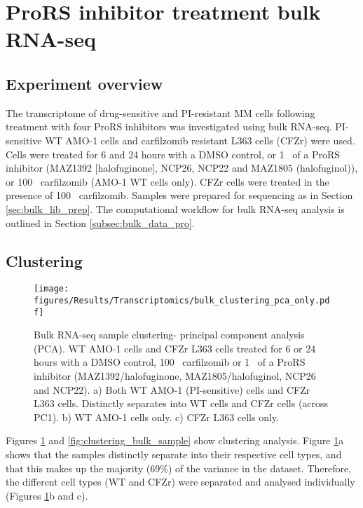 \clearpage

\section{ProRS inhibitor treatment bulk RNA-seq}

\subsection{Experiment overview}
The transcriptome of drug-sensitive and PI-resistant MM cells following treatment with four ProRS inhibitors was investigated using bulk RNA-seq.
PI-sensitive WT AMO-1 cells and carfilzomib resistant L363 cells (CFZr) were used.
Cells were treated for 6 and 24 hours with a DMSO control, or 1\si{\micro\Molar} of a ProRS inhibitor (MAZ1392 [halofuginone], NCP26, NCP22 and MAZ1805 (halofuginol)), or 100\si{\nano\Molar} carfilzomib (AMO-1 WT cells only).
CFZr cells were treated in the presence of 100\si{\nano\Molar} carfilzomib.
Samples were prepared for sequencing as in Section \ref{sec:bulk_lib_prep}.
The computational workflow for bulk RNA-seq analysis is outlined in Section \ref{subsec:bulk_data_pro}.

\subsection{Clustering}

\begin{figure}[ht]
\centering
\texttt{[image: figures/Results/Transcriptomics/bulk\_clustering\_pca\_only.pdf]}
\caption[Bulk RNA-seq sample clustering- PCA]{Bulk RNA-seq sample clustering- principal component analysis (PCA).
WT AMO-1 cells and CFZr L363 cells treated for 6 or 24 hours with a DMSO control, 100\si{\nano\Molar} carfilzomib or 1\si{\micro\Molar} of a ProRS inhibitor (MAZ1392/halofuginone, MAZ1805/halofuginol, NCP26 and NCP22).
a) Both WT AMO-1 (PI-sensitive) cells and CFZr L363 cells.
Distinctly separates into WT cells and CFZr cells (across PC1)\@.
b) WT AMO-1 cells only.
c) CFZr L363 cells only.
}
\label{fig:clustering_bulk}\end{figure}

Figures \ref{fig:clustering_bulk} and \ref{fig:clustering_bulk_sample} show clustering analysis.
Figure \ref{fig:clustering_bulk}a shows that the samples distinctly separate into their respective cell types, and that this makes up the majority (69\%) of the variance in the dataset.
Therefore, the different cell types (WT and CFZr) were separated and analysed individually (Figures \ref{fig:clustering_bulk}b and c).

